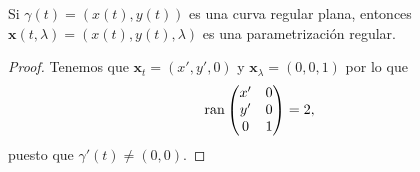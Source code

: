 \begin{lema}
Si $\displaystyle \gamma\left(t\right)=\left(x\left(t\right), y\left(t\right)\right) $ es una curva regular plana, entonces $\displaystyle \textbf{x} \left(t, \lambda \right) = \left(x\left(t\right), y\left(t\right), \lambda \right) $ es una parametrización regular.
\end{lema}
\begin{proof}
Tenemos que $\displaystyle \textbf{x} _{t}=\left(x', y', 0\right) $ y $\displaystyle \textbf{x} _{\lambda }=\left(0,0,1\right) $ por lo que
\[ \operatorname{ran}\begin{pmatrix} x' & 0 \\ y' & 0 \\ 0 & 1 \end{pmatrix}=2 ,\]
puesto que $\displaystyle \gamma'\left(t\right)\neq \left(0,0\right) $.  
\end{proof}

